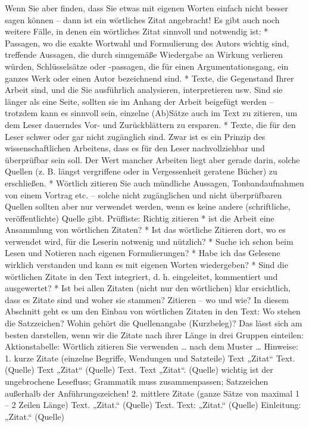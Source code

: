 \documentclass[]{book}
\theoremstyle{definition}
\theoremstyle{definition}
\theoremstyle{definition}
\theoremstyle{remark}
\begin{document}
Wenn Sie aber finden, dass Sie etwas mit eigenen Worten einfach nicht
besser sagen können -- dann ist ein wörtliches Zitat angebracht! Es gibt
auch noch weitere Fälle, in denen ein wörtliches Zitat sinnvoll und
notwendig ist: * Passagen, wo die exakte Wortwahl und Formulierung des
Autors wichtig sind, treffende Aussagen, die durch sinngemäße Wiedergabe
an Wirkung verlieren würden, Schlüsselsätze oder -passagen, die für
einen Argumentationsgang, ein ganzes Werk oder einen Autor bezeichnend
sind. * Texte, die Gegenstand Ihrer Arbeit sind, und die Sie ausführlich
analysieren, interpretieren usw. Sind sie länger als eine Seite, sollten
sie im Anhang der Arbeit beigefügt werden -- trotzdem kann es sinnvoll
sein, einzelne (Ab)Sätze auch im Text zu zitieren, um dem Leser
dauerndes Vor- und Zurückblättern zu ersparen. * Texte, die für den
Leser schwer oder gar nicht zugänglich sind. Zwar ist es ein Prinzip des
wissenschaftlichen Arbeitens, dass es für den Leser nachvollziehbar und
überprüfbar sein soll. Der Wert mancher Arbeiten liegt aber gerade
darin, solche Quellen (z. B. längst vergriffene oder in Vergessenheit
geratene Bücher) zu erschließen. * Wörtlich zitieren Sie auch mündliche
Aussagen, Tonbandaufnahmen von einem Vortrag etc. -- solche nicht
zugänglichen und nicht überprüfbaren Quellen sollten aber nur verwendet
werden, wenn es keine andere (schriftliche, veröffentlichte) Quelle
gibt. Prüfliste: Richtig zitieren * ist die Arbeit eine Ansammlung von
wörtlichen Zitaten? * Ist das wörtliche Zitieren dort, wo es verwendet
wird, für die Leserin notwenig und nützlich? * Suche ich schon beim
Lesen und Notieren nach eigenen Formulierungen? * Habe ich das Gelesene
wirklich verstanden und kann es mit eigenen Worten wiedergeben? * Sind
die wörtlichen Zitate in den Text integriert, d. h. eingeleitet,
kommentiert und ausgewertet? * Ist bei allen Zitaten (nicht nur den
wörtlichen) klar ersichtlich, dass es Zitate sind und woher sie stammen?
Zitieren -- wo und wie? In diesem Abschnitt geht es um den Einbau von
wörtlichen Zitaten in den Text: Wo stehen die Satzzeichen? Wohin gehört
die Quellenangabe (Kurzbeleg)? Das lässt sich am besten darstellen, wenn
wir die Zitate nach ihrer Länge in drei Gruppen einteilen:
Aktionstabelle: Wörtlich zitieren Sie verwenden \ldots{} nach dem Muster
\ldots{} Hinweise: 1. kurze Zitate (einzelne Begriffe, Wendungen und
Satzteile) Text „Zitat`` Text. (Quelle) Text „Zitat`` (Quelle) Text.
Text „Zitat``. (Quelle) wichtig ist der ungebrochene Lesefluss;
Grammatik muss zusammenpassen; Satzzeichen außerhalb der
Anführungszeichen! 2. mittlere Zitate (ganze Sätze von maximal 1 -- 2
Zeilen Länge) Text. „Zitat.`` (Quelle) Text. Text: „Zitat.`` (Quelle)
Einleitung: „Zitat.`` (Quelle)
\end{document}
